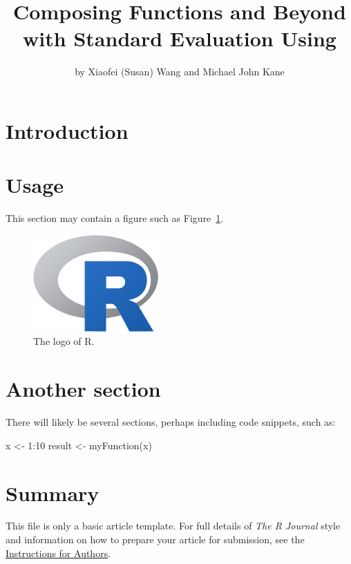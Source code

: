 \title{Composing Functions and Beyond with Standard Evaluation Using }
\author{by Xiaofei (Susan) Wang and Michael John Kane}
\maketitle


\section{Introduction}
\cite{R}
\section{Usage}

This section may contain a figure such as Figure~\ref{figure:rlogo}.

\begin{figure}[htbp]
  \centering
  \includegraphics{Rlogo-5}
  \caption{The logo of R.}
  \label{figure:rlogo}
\end{figure}

\section{Another section}

There will likely be several sections, perhaps including code snippets, such as:

\begin{example}
  x <- 1:10
  result <- myFunction(x)
\end{example}

\section{Summary}

This file is only a basic article template. For full details of \emph{The R Journal} style and information on how to prepare your article for submission, see the \href{https://journal.r-project.org/share/author-guide.pdf}{Instructions for Authors}.

